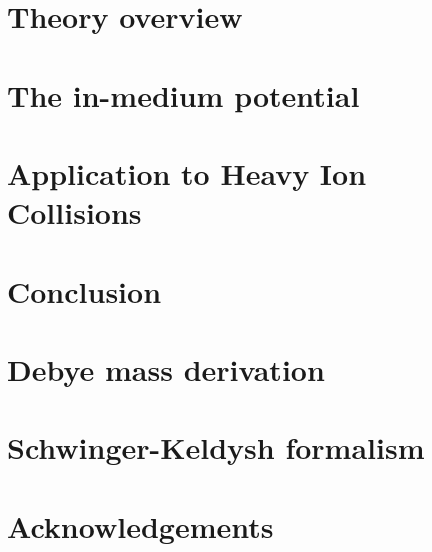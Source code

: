 \documentclass[12pt, a4paper, twoside]{book}
\begin{document}
\chapter{Theory overview}
\onehalfspacing
\chapter{The in-medium potential}
\onehalfspacing
\chapter{Application to Heavy Ion Collisions}
\onehalfspacing
\chapter{Conclusion}
\onehalfspacing

\begin{appendices}
\chapter{Debye mass derivation}
\chapter{Schwinger-Keldysh formalism}
\end{appendices}



\chapter*{Acknowledgements}


\cleardoublepage

\end{document}
